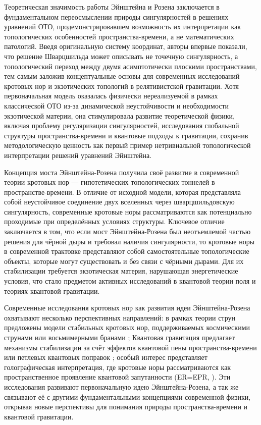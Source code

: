 Теоретическая значимость работы Эйнштейна и Розена заключается в фундаментальном переосмыслении природы сингулярностей в решениях уравнений ОТО, продемонстрировавшем возможность их интерпретации как топологических особенностей пространства-времени, а не математических патологий. Введя оригинальную систему координат, авторы впервые показали, что решение Шварцшильда может описывать не точечную сингулярность, а топологический переход между двумя асимптотически плоскими пространствами, тем самым заложив концептуальные основы для современных исследований кротовых нор и экзотических топологий в релятивистской гравитации. Хотя первоначальная модель оказалась физически нереализуемой в рамках классической ОТО из-за динамической неустойчивости и необходимости экзотической материи, она стимулировала развитие теоретической физики, включая проблему регуляризации сингулярностей, исследования глобальной структуры пространства-времени и квантовые подходы к гравитации, сохранив методологическую ценность как первый пример нетривиальной топологической интерпретации решений уравнений Эйнштейна.

Концепция моста Эйнштейна-Розена получила своё развитие в современной теории кротовых нор — гипотетических топологических тоннелей в пространстве-времени. В отличие от исходной модели, которая представляла собой неустойчивое соединение двух вселенных через шварцшильдовскую сингулярность, современные кротовые норы рассматриваются как потенциально проходимые при определённых условиях структуры. Ключевое отличие заключается в том, что если мост Эйнштейна-Розена был неотъемлемой частью решения для чёрной дыры и требовал наличия сингулярности, то кротовые норы в современной трактовке \cite{morris1988wormholes}  представляют собой самостоятельные топологические объекты, которые могут существовать и без связи с чёрными дырами. Для их стабилизации требуется экзотическая материя, нарушающая энергетические условия, что стало предметом активных исследований в квантовой теории поля и теориях квантовой гравитации.

Современные исследования кротовых нор как развития идеи Эйнштейна-Розена охватывают несколько перспективных направлений: в рамках теории струн предложены модели стабильных кротовых нор, поддерживаемых космическими струнами или восьмимерными бранами \cite{maldacena2021humanly}; Квантовая гравитация предлагает механизмы стабилизации за счёт эффектов квантовой пены пространства-времени \cite{wheeler1957nature, misner1957classical} или петлевых квантовых поправок \cite{ashtekar2018quantum}; особый интерес представляет голографическая интерпретация, где кротовые норы рассматриваются как пространственное проявление квантовой запутанности (ER=EPR, \cite{maldacenaCoolHorizonsEntangled2013}). Эти исследования  развивают первоначальную идею Эйнштейна-Розена, а так же связывают её с другими фундаментальными концепциями современной физики, открывая новые перспективы для понимания природы пространства-времени и квантовой гравитации.

